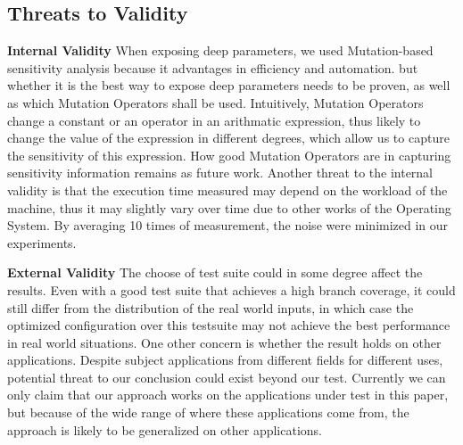 \subsection{Threats to Validity}

\textbf{Internal Validity}  When exposing deep parameters, we used Mutation-based sensitivity analysis because it advantages in efficiency and automation. but whether it is the best way to expose deep parameters needs to be proven, as well as which Mutation Operators shall be used. Intuitively, Mutation Operators change a constant or an operator in an arithmatic expression, thus likely to change the value of the expression in different degrees, which allow us to capture the sensitivity of this expression. How good Mutation Operators are in capturing sensitivity information remains as future work.
Another threat to the internal validity is that the execution time measured may depend on the workload of the machine, thus it may slightly vary over time due to other works of the Operating System. By averaging 10 times of measurement, the noise were minimized in our experiments.  

\textbf{External Validity}  The choose of test suite could in some degree affect the results. Even with a good test suite that achieves a high branch coverage, it could still differ from the distribution of the real world inputs, in which case the optimized configuration over this testsuite may not achieve the best performance in real world situations. 
One other concern is whether the result holds on other applications. Despite subject applications from different fields for different uses, potential threat to our conclusion could exist beyond our test. Currently we can only claim that our approach works on the applications under test in this paper, but because of the wide range of where these applications come from, the approach is likely to be generalized on other applications.
